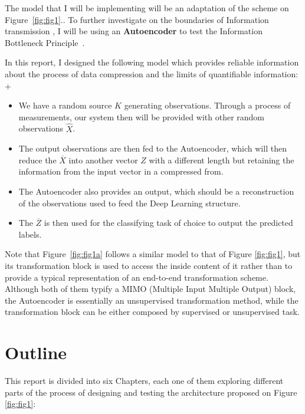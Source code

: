 The model that I will be implementing will be an adaptation of the scheme on Figure~\ref{fig:fig1}.. To further investigate on the boundaries of Information transmission , I will be using an \textbf{Autoencoder} to test the Information Bottleneck Principle~\cite{Inf_Bottleneck_first}.

In this report, I designed the following model which provides reliable information about the process of data compression and the limits of quantifiable information:
+
\begin{itemize}
	\item  We have a random source $K$ generating observations. Through a process of measurements, our system then will be provided with other random observations $\hat{X}$. 
	
	\item The output observations  are then fed to the Autoencoder, which will then reduce the $\overline X$ into another vector $Z$ with a different length but retaining the information from the input vector in a compressed from. 
	
	\item The Autoencoder also provides  an output, which should be a reconstruction of the observations used to feed the Deep Learning structure. 
	
	\item The $\overline Z$ is then used for the classifying task of choice to output the predicted labels. 
	
\end{itemize}

Note that Figure~\ref{fig:fig1a} follows a similar model to that of Figure \ref{fig:fig1}, but its transformation block is used to access the inside content of it rather than to provide a typical representation of an end-to-end transformation scheme. Although both of them typify a MIMO (Multiple Input Multiple Output) block, the Autoencoder is essentially an unsupervised transformation method, while the transformation block can be either composed by supervised or unsupervised task.\par


\section{Outline}

This report is divided into six Chapters, each one of them exploring different parts of the process of designing and testing the architecture proposed on Figure \ref{fig:fig1}:

